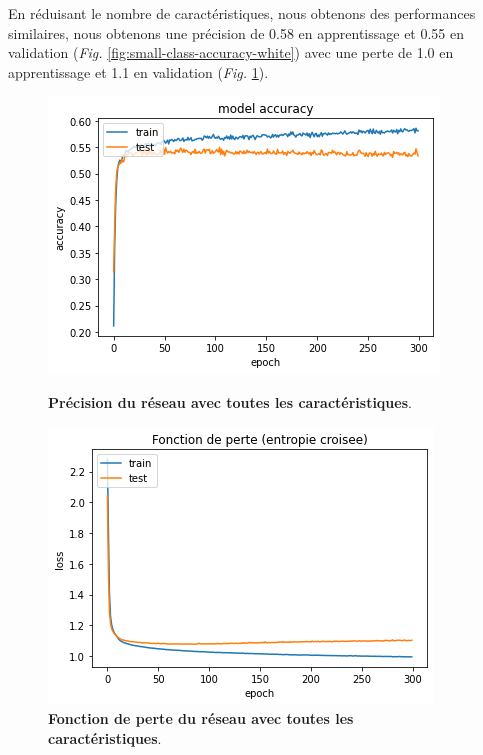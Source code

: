 En réduisant le nombre de caractéristiques, nous obtenons des performances similaires, nous obtenons une précision de 0.58 en apprentissage
et 0.55 en validation (\textit{Fig.} \ref{fig:small-class-accuracy-white}) avec une perte de 1.0 en apprentissage et 1.1 en validation
(\textit{Fig.} \ref{fig:small-class-loss-white}).

\begin{figure}[ht]
	\centering
	\begin{minipage}[t]{0.48\textwidth}
		\centering
		\includegraphics[scale=0.475]{../images/vins_blancs/small_class_accuracy_white.png}
		\caption[Précision du réseau avec toutes les caractéristiques.]
		{\textbf{Précision du réseau avec toutes les caractéristiques}.}
		\label{fig:small-class-accuracy-white}
	\end{minipage}\hfill
	\begin{minipage}[t]{0.48\textwidth}
		\centering
		\includegraphics[scale=0.475]{../images/vins_blancs/small_class_loss_white.png}
		\caption[Fonction de perte du réseau avec toutes les caractéristiques.]
		{\textbf{Fonction de perte du réseau avec toutes les caractéristiques}.}
		\label{fig:small-class-loss-white}
	\end{minipage}
\end{figure}

